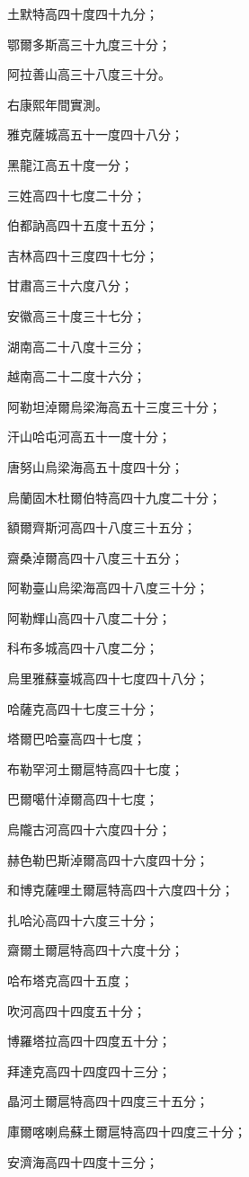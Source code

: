 \begin{pinyinscope}
土默特高四十度四十九分；

鄂爾多斯高三十九度三十分；

阿拉善山高三十八度三十分。

右康熙年間實測。

雅克薩城高五十一度四十八分；

黑龍江高五十度一分；

三姓高四十七度二十分；

伯都訥高四十五度十五分；

吉林高四十三度四十七分；

甘肅高三十六度八分；

安徽高三十度三十七分；

湖南高二十八度十三分；

越南高二十二度十六分；

阿勒坦淖爾烏梁海高五十三度三十分；

汗山哈屯河高五十一度十分；

唐努山烏梁海高五十度四十分；

烏蘭固木杜爾伯特高四十九度二十分；

額爾齊斯河高四十八度三十五分；

齋桑淖爾高四十八度三十五分；

阿勒臺山烏梁海高四十八度三十分；

阿勒輝山高四十八度二十分；

科布多城高四十八度二分；

烏里雅蘇臺城高四十七度四十八分；

哈薩克高四十七度三十分；

塔爾巴哈臺高四十七度；

布勒罕河土爾扈特高四十七度；

巴爾噶什淖爾高四十七度；

烏隴古河高四十六度四十分；

赫色勒巴斯淖爾高四十六度四十分；

和博克薩哩土爾扈特高四十六度四十分；

扎哈沁高四十六度三十分；

齋爾土爾扈特高四十六度十分；

哈布塔克高四十五度；

吹河高四十四度五十分；

博羅塔拉高四十四度五十分；

拜達克高四十四度四十三分；

晶河土爾扈特高四十四度三十五分；

庫爾喀喇烏蘇土爾扈特高四十四度三十分；

安濟海高四十四度十三分；


\end{pinyinscope}

